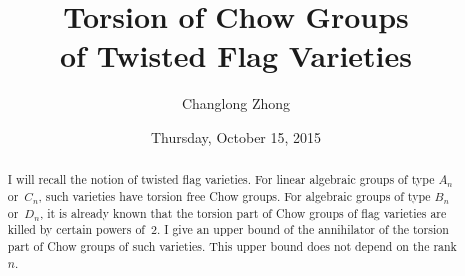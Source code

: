 \documentclass{UAmathtalk}
\author{Changlong Zhong}
\title{Torsion of Chow Groups\\ of Twisted Flag Varieties}
\date{Thursday, October 15, 2015}
\begin{document}
\maketitle

\begin{abstract}
I will recall the notion of twisted flag varieties.
For linear algebraic groups of type $A_n$ or~$C_n$, such varieties have torsion free Chow groups.
For algebraic groups of type $B_n$ or~$D_n$, it is already known that the torsion part of Chow groups of flag varieties are killed by certain powers of~$2$.
I give an upper bound of the annihilator of the torsion part of Chow groups of such varieties.
This upper bound does not depend on the rank~$n$.
\end{abstract}
\end{document}
